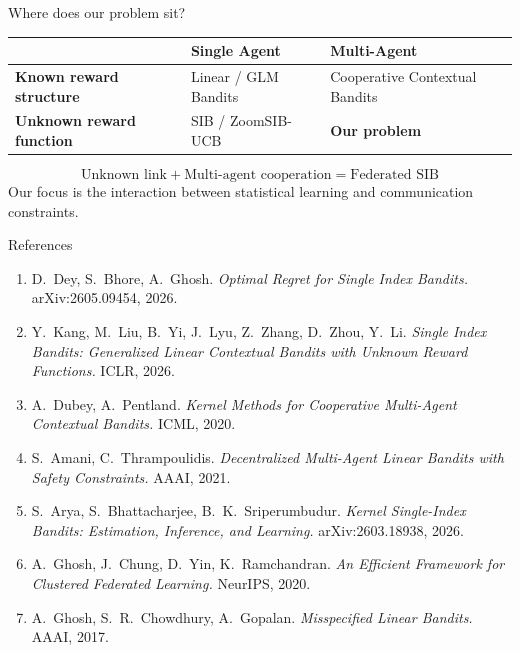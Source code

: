 \documentclass[11pt]{beamer}
\begin{document}
\begin{frame}{Where does our problem sit?}
\centering
\renewcommand{\arraystretch}{1.35}
\begin{tabular}{>{\centering\arraybackslash}p{3cm}>{\centering\arraybackslash}p{3cm}>{\centering\arraybackslash}p{3cm}}
\toprule
&\textbf{Single Agent}&\textbf{Multi-Agent}\\
\midrule
\textbf{Known reward structure}&Linear / GLM Bandits&Cooperative Contextual Bandits\\
\midrule
\textbf{Unknown reward function}&SIB / ZoomSIB-UCB&\alert{\textbf{Our problem}}\\
\bottomrule
\end{tabular}
\vspace{0.6em}
\[
\boxed{\text{Unknown link}+\text{Multi-agent cooperation}=\text{Federated SIB}}
\]
\vspace{0.2em}
\small
Our focus is the interaction between statistical learning and communication constraints.
\end{frame}

\begin{frame}{References}
\footnotesize
\begin{enumerate}
\item D.~Dey, S.~Bhore, A.~Ghosh. \emph{Optimal Regret for Single Index Bandits.} arXiv:2605.09454, 2026.
\item Y.~Kang, M.~Liu, B.~Yi, J.~Lyu, Z.~Zhang, D.~Zhou, Y.~Li. \emph{Single Index Bandits: Generalized Linear Contextual Bandits with Unknown Reward Functions.} ICLR, 2026.
\item A.~Dubey, A.~Pentland. \emph{Kernel Methods for Cooperative Multi-Agent Contextual Bandits.} ICML, 2020.
\item S.~Amani, C.~Thrampoulidis. \emph{Decentralized Multi-Agent Linear Bandits with Safety Constraints.} AAAI, 2021.
\item S.~Arya, S.~Bhattacharjee, B.~K.~Sriperumbudur. \emph{Kernel Single-Index Bandits: Estimation, Inference, and Learning.} arXiv:2603.18938, 2026.
\item A.~Ghosh, J.~Chung, D.~Yin, K.~Ramchandran. \emph{An Efficient Framework for Clustered Federated Learning.} NeurIPS, 2020.
\item A.~Ghosh, S.~R.~Chowdhury, A.~Gopalan. \emph{Misspecified Linear Bandits.} AAAI, 2017.
\end{enumerate}
\end{frame}


\end{document}
